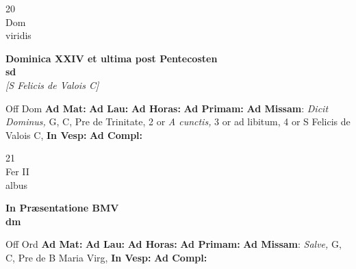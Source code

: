 \documentclass[10pt, openany]{book}
\begin{document}
        \begin{center}
            \begin{minipage}{3.5in}
                \vspace{2em}
                \begin{minipage}{0.5in}
                    {\Huge 20} \\
                    {\normalsize Dom} \\
                    {\normalsize viridis}
                \end{minipage}
                \begin{minipage}{3.0in}
                    \textbf{ \large Dominica XXIV et ultima post Pentecosten \\
                    \textnormal{\normalsize sd}} \\ \textit{[S Felicis de Valois C]} \\ 
                \end{minipage}
                \begin{justify}Off Dom
                    \textbf{Ad Mat: }
                    \textbf{Ad Lau: }
                    \textbf{Ad Horas: }
                    \textbf{Ad Primam: }\textbf{Ad Missam}: \textit{Dicit Dominus,} G, C, Pre de Trinitate, 2 or \textit{A cunctis,} 3 or ad libitum, 4 or S Felicis de Valois C,  
                    \textbf{In Vesp: }
                    \textbf{Ad Compl: }
                \end{justify}
            \end{minipage}
        \end{center}
    
        \begin{center}
            \begin{minipage}{3.5in}
                \vspace{2em}
                \begin{minipage}{0.5in}
                    {\Huge 21} \\
                    {\normalsize Fer II} \\
                    {\normalsize albus}
                \end{minipage}
                \begin{minipage}{3.0in}
                    \textbf{ \large In Præsentatione BMV \\
                    \textnormal{\normalsize dm}} \\ 
                \end{minipage}
                \begin{justify}Off Ord
                    \textbf{Ad Mat: }
                    \textbf{Ad Lau: }
                    \textbf{Ad Horas: }
                    \textbf{Ad Primam: }\textbf{Ad Missam}: \textit{Salve,} G, C, Pre de B Maria Virg,  
                    \textbf{In Vesp: }
                    \textbf{Ad Compl: }
                \end{justify}
            \end{minipage}
        \end{center}
    
\end{document}
